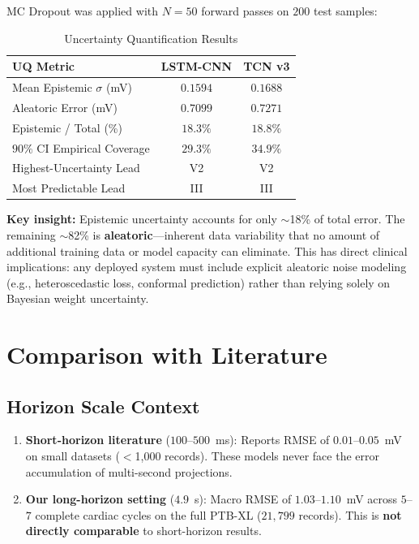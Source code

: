 \documentclass[10pt,journal,compsoc]{IEEEtran}
\begin{document}
MC Dropout was applied with $N=50$ forward passes on $200$ test samples:

\begin{table}[h]
\caption{Uncertainty Quantification Results}
\label{tab:uq}
\centering
\begin{tabular}{lcc}
\toprule
\textbf{UQ Metric} & \textbf{LSTM-CNN} & \textbf{TCN v3} \\
\midrule
Mean Epistemic $\sigma$ (mV) & $0.1594$ & $0.1688$ \\
Aleatoric Error (mV) & $0.7099$ & $0.7271$ \\
Epistemic / Total (\%) & $18.3\%$ & $18.8\%$ \\
$90\%$ CI Empirical Coverage & $29.3\%$ & $34.9\%$ \\
Highest-Uncertainty Lead & V2 & V2 \\
Most Predictable Lead & III & III \\
\bottomrule
\end{tabular}
\end{table}

\textbf{Key insight:} Epistemic uncertainty accounts for only $\sim$18\% of total error. The remaining $\sim$82\% is \textbf{aleatoric}---inherent data variability that no amount of additional training data or model capacity can eliminate. This has direct clinical implications: any deployed system must include explicit aleatoric noise modeling (e.g., heteroscedastic loss, conformal prediction) rather than relying solely on Bayesian weight uncertainty.

\section{Comparison with Literature}
\label{sec:literature}

\subsection{Horizon Scale Context}
\begin{enumerate}
    \item \textbf{Short-horizon literature} ($100$--$500$~ms): Reports RMSE of $0.01$--$0.05$~mV on small datasets ($<$1,000 records). These models never face the error accumulation of multi-second projections.
    \item \textbf{Our long-horizon setting} ($4.9$~s): Macro RMSE of $1.03$--$1.10$~mV across $5$--$7$ complete cardiac cycles on the full PTB-XL ($21{,}799$ records). This is \textbf{not directly comparable} to short-horizon results.
\end{enumerate}
\end{document}
